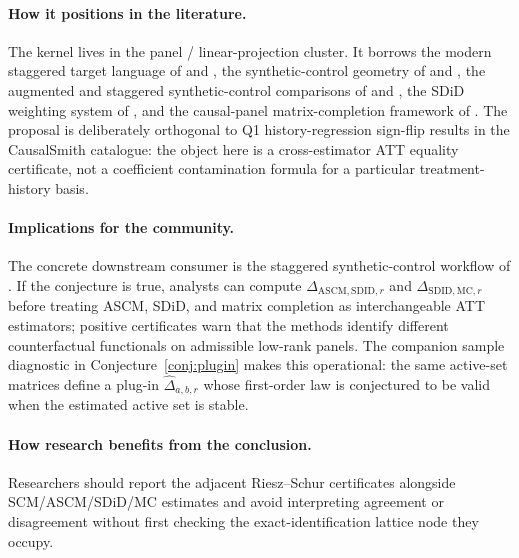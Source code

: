 \documentclass[11pt]{article}
\theoremstyle{definition}
\theoremstyle{plain}
\theoremstyle{remark}
\begin{document}
\paragraph{How it positions in the literature.}
The kernel lives in the panel / linear-projection cluster. It borrows the
modern staggered target language of \citet{CallawaySantAnna2021} and
\citet{BorusyakJaravelSpiess2024}, the synthetic-control geometry of
\citet{AbadieDiamondHainmueller2010} and \citet{DoudchenkoImbens2016}, the
augmented and staggered synthetic-control comparisons of
\citet{BenMichaelFellerRothstein2021} and
\citet{BenMichaelFellerRothstein2022}, the SDiD weighting system of
\citet{ArkhangelskyAtheyHirshbergImbensWager2021}, and the causal-panel
matrix-completion framework of
\citet{AtheyBayatiDoudchenkoImbensKhosravi2021}. The proposal is deliberately
orthogonal to Q1 history-regression sign-flip results in the CausalSmith
catalogue: the object here is a cross-estimator ATT equality certificate, not
a coefficient contamination formula for a particular treatment-history basis.

\paragraph{Implications for the community.}
The concrete downstream consumer is the staggered synthetic-control workflow
of \citet{BenMichaelFellerRothstein2022}. If the conjecture is true, analysts
can compute $\Delta_{\mathrm{ASCM},\mathrm{SDID},r}$ and
$\Delta_{\mathrm{SDID},\mathrm{MC},r}$ before treating ASCM, SDiD, and matrix
completion as interchangeable ATT estimators; positive certificates warn that
the methods identify different counterfactual functionals on admissible
low-rank panels. The companion sample diagnostic in
Conjecture~\ref{conj:plugin} makes this operational: the same active-set
matrices define a plug-in $\widehat\Delta_{a,b,r}$ whose first-order law is
conjectured to be valid when the estimated active set is stable.

\paragraph{How research benefits from the conclusion.}
Researchers should report the adjacent Riesz--Schur certificates alongside
SCM/ASCM/SDiD/MC estimates and avoid interpreting agreement or disagreement
without first checking the exact-identification lattice node they occupy.
\end{document}
